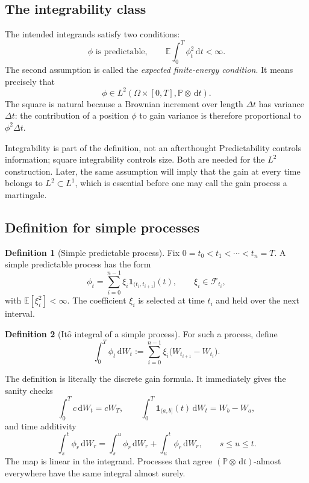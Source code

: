 \documentclass[10pt]{article}
\newcommand{\E}{\mathbb E}
\newcommand{\Pbb}{\mathbb P}
\newcommand{\1}{\mathbf 1}
\newcommand{\cF}{\mathcal F}
\newcommand{\dd}{\,\mathrm d}
\newcommand{\Ito}{\mathrm{It\hat{o}}}
\theoremstyle{definition}
\newtheorem{definition}{Definition}[section]
\begin{document}
\subsection{The integrability class}

The intended integrands satisfy two conditions:
\[
\phi\text{ is predictable},
\qquad
\E\int_0^T\phi_t^2\dd t<\infty.
\]
The second assumption is called the \emph{expected finite-energy condition}.
It means precisely that
\[
\phi\in L^2(\Omega\times[0,T],\Pbb\otimes\dd t).
\]
The square is natural because a Brownian increment over length \(\Delta t\)
has variance \(\Delta t\): the contribution of a position \(\phi\) to gain
variance is therefore proportional to \(\phi^2\Delta t\).

\begin{warningbox}{Integrability is part of the definition, not an afterthought}
Predictability controls information; square integrability controls size. Both
are needed for the \(L^2\) construction. Later, the same assumption will imply
that the gain at every time belongs to \(L^2\subset L^1\), which is essential
before one may call the gain process a martingale.
\end{warningbox}

\subsection{Definition for simple processes}

\begin{definition}[Simple predictable process]
Fix \(0=t_0<t_1<\cdots<t_n=T\). A simple predictable process has the form
\[
\phi_t=\sum_{i=0}^{n-1}\xi_i\1_{(t_i,t_{i+1}]}(t),
\qquad
\xi_i\in\cF_{t_i},
\]
with \(\E[\xi_i^2]<\infty\). The coefficient \(\xi_i\) is selected at time
\(t_i\) and held over the next interval.
\end{definition}

\begin{definition}[\(\Ito\) integral of a simple process]
For such a process, define
\[
\boxed{
\int_0^T\phi_t\dd W_t
:=\sum_{i=0}^{n-1}\xi_i
\bigl(W_{t_{i+1}}-W_{t_i}\bigr).}
\]
\end{definition}

The definition is literally the discrete gain formula. It immediately gives
the sanity checks
\[
\int_0^Tc\dd W_t=cW_T,
\qquad
\int_0^T\1_{(a,b]}(t)\dd W_t=W_b-W_a,
\]
and time additivity
\[
\int_s^t\phi_r\dd W_r
=\int_s^u\phi_r\dd W_r+\int_u^t\phi_r\dd W_r,
\qquad s\leq u\leq t.
\]
The map is linear in the integrand. Processes that agree
\((\Pbb\otimes\dd t)\)-almost everywhere have the same integral almost surely.
\end{document}
